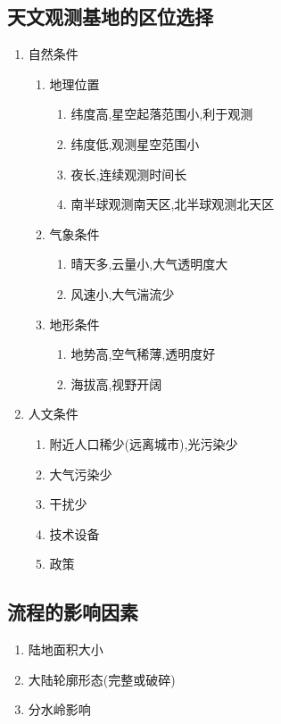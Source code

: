 \documentclass[a4paper]{article}
\begin{document}
    \subsection{天文观测基地的区位选择}
    \begin{enumerate}
        \item 自然条件
        \begin{enumerate}
            \item 地理位置
            \begin{enumerate}
                \item 纬度高,星空起落范围小,利于观测
                \item 纬度低,观测星空范围小
                \item 夜长,连续观测时间长
                \item 南半球观测南天区,北半球观测北天区
            \end{enumerate}
            \item 气象条件
            \begin{enumerate}
                \item 晴天多,云量小,大气透明度大
                \item 风速小,大气湍流少
            \end{enumerate}
            \item 地形条件
            \begin{enumerate}
                \item 地势高,空气稀薄,透明度好
                \item 海拔高,视野开阔
            \end{enumerate}
        \end{enumerate}
        \item 人文条件
        \begin{enumerate}
            \item 附近人口稀少(远离城市),光污染少
            \item 大气污染少
            \item 干扰少
            \item 技术设备
            \item 政策
        \end{enumerate}
    \end{enumerate}
    \subsection{流程的影响因素}
    \begin{enumerate}
        \item 陆地面积大小
        \item 大陆轮廓形态(完整或破碎)
        \item 分水岭影响
    \end{enumerate}
\end{document}
